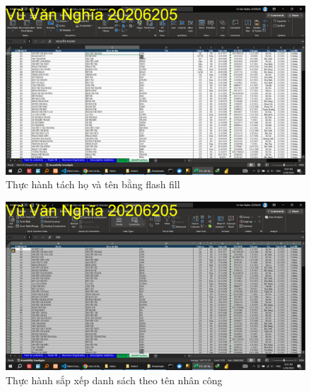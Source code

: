 \documentclass{article}
\begin{document}
\begin{figure}[h]
\centering
\includegraphics[scale = 0.15]{Video1/ThucHanh/4.png}
\caption{Thực hành tách họ và tên bằng flash fill}
\end{figure}

\begin{figure}[h]
\centering
\includegraphics[scale = 0.15]{Video1/ThucHanh/5.png}
\caption{Thực hành sắp xếp danh sách theo tên nhân công}
\end{figure}
\end{document}
